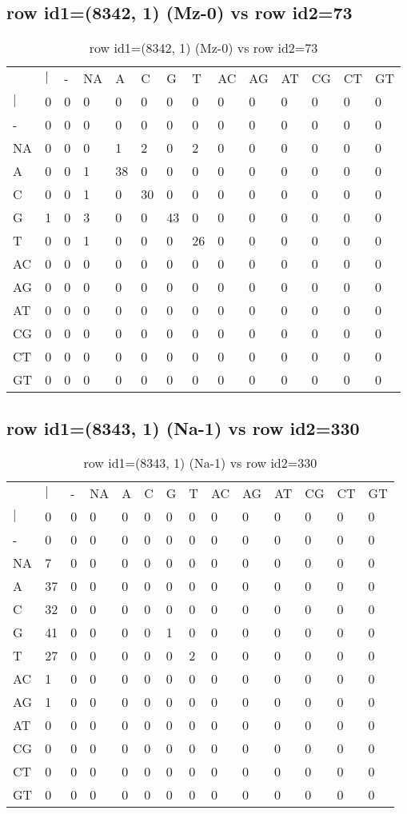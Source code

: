 \subsection{row id1=(8342, 1) (Mz-0) vs row id2=73}
\begin{center}
\begin{longtable}{|l|l|l|l|l|l|l|l|l|l|l|l|l|l|}
\caption{row id1=(8342, 1) (Mz-0) vs row id2=73} \label{table_dm546}\\
\hline
\\
\hline
&$|$&-&NA&A&C&G&T&AC&AG&AT&CG&CT&GT\\
$|$&0&0&0&0&0&0&0&0&0&0&0&0&0\\
-&0&0&0&0&0&0&0&0&0&0&0&0&0\\
NA&0&0&0&1&2&0&2&0&0&0&0&0&0\\
A&0&0&1&38&0&0&0&0&0&0&0&0&0\\
C&0&0&1&0&30&0&0&0&0&0&0&0&0\\
G&1&0&3&0&0&43&0&0&0&0&0&0&0\\
T&0&0&1&0&0&0&26&0&0&0&0&0&0\\
AC&0&0&0&0&0&0&0&0&0&0&0&0&0\\
AG&0&0&0&0&0&0&0&0&0&0&0&0&0\\
AT&0&0&0&0&0&0&0&0&0&0&0&0&0\\
CG&0&0&0&0&0&0&0&0&0&0&0&0&0\\
CT&0&0&0&0&0&0&0&0&0&0&0&0&0\\
GT&0&0&0&0&0&0&0&0&0&0&0&0&0\\
\hline
\end{longtable}
\end{center}

\subsection{row id1=(8343, 1) (Na-1) vs row id2=330}
\begin{center}
\begin{longtable}{|l|l|l|l|l|l|l|l|l|l|l|l|l|l|}
\caption{row id1=(8343, 1) (Na-1) vs row id2=330} \label{table_dm548}\\
\hline
\\
\hline
&$|$&-&NA&A&C&G&T&AC&AG&AT&CG&CT&GT\\
$|$&0&0&0&0&0&0&0&0&0&0&0&0&0\\
-&0&0&0&0&0&0&0&0&0&0&0&0&0\\
NA&7&0&0&0&0&0&0&0&0&0&0&0&0\\
A&37&0&0&0&0&0&0&0&0&0&0&0&0\\
C&32&0&0&0&0&0&0&0&0&0&0&0&0\\
G&41&0&0&0&0&1&0&0&0&0&0&0&0\\
T&27&0&0&0&0&0&2&0&0&0&0&0&0\\
AC&1&0&0&0&0&0&0&0&0&0&0&0&0\\
AG&1&0&0&0&0&0&0&0&0&0&0&0&0\\
AT&0&0&0&0&0&0&0&0&0&0&0&0&0\\
CG&0&0&0&0&0&0&0&0&0&0&0&0&0\\
CT&0&0&0&0&0&0&0&0&0&0&0&0&0\\
GT&0&0&0&0&0&0&0&0&0&0&0&0&0\\
\hline
\end{longtable}
\end{center}

